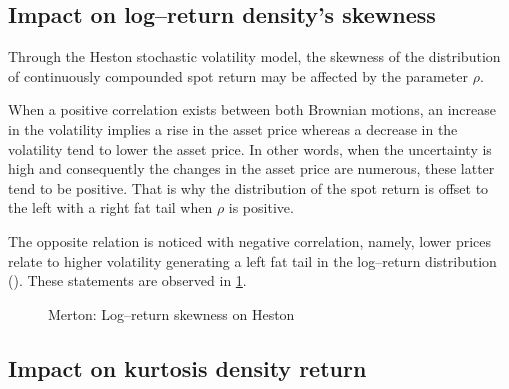 \documentclass[12pt]{report}
\begin{document}
\subsection{Impact on log--return density's skewness}
\label{sub:hestonskewness}

Through the Heston stochastic volatility model, the skewness of the distribution of continuously compounded spot return may be affected by the parameter $\rho$. 

When a positive correlation exists between both Brownian motions, an increase in the volatility implies a rise in the asset price whereas a decrease in the volatility tend to lower the asset price.
In other words, when the uncertainty is high and consequently the changes in the asset price are numerous, these latter tend to be positive. 
That is why the distribution of the spot return is offset to the left with a right fat tail when $\rho$ is positive.

The opposite relation is noticed with negative correlation, namely, lower prices relate to higher volatility generating a left fat tail in the log–return distribution (\citet{heston1993}).
These statements are observed in \cref{p:other:heston:skewness}.



\begin{figure}[ht]
\centering

\caption{Merton: Log--return skewness on Heston}
\label{p:other:heston:skewness}
\end{figure}

\subsection{Impact on kurtosis density return}
\label{sub:hestonkurtosis}
\end{document}
